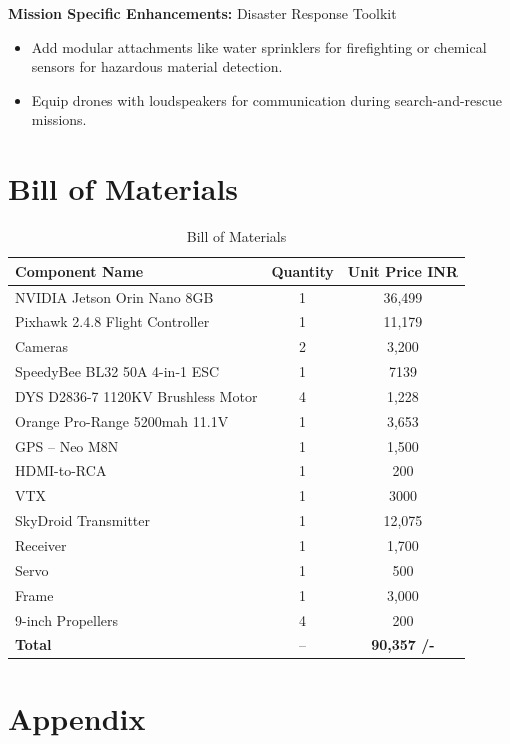 \documentclass[12pt]{report}
\begin{document}
    \noindent \textbf{Mission Specific Enhancements:} Disaster Response Toolkit 
    \begin{itemize}
      \item Add modular attachments like water sprinklers for firefighting or chemical sensors for hazardous material detection.
      \item Equip drones with loudspeakers for communication during search-and-rescue missions.
    \end{itemize}

  \chapter{Bill of Materials}
    \begin{table}[h!]
      \centering
      \caption{Bill of Materials} \vspace{0.2cm}
        \begin{tabular}{|l|c|c|}
          \hline
          \textbf{Component Name} & \textbf{Quantity} & \textbf{Unit Price {INR}} \\
          \hline
          NVIDIA Jetson Orin Nano 8GB & 1 & 36,499 \\
          Pixhawk 2.4.8 Flight Controller & 1 & 11,179 \\
          Cameras & 2 & 3,200 \\
          SpeedyBee BL32 50A 4-in-1 ESC &1 &7139\\
          DYS D2836-7 1120KV Brushless Motor &4 &1,228\\
          Orange Pro-Range 5200mah 11.1V & 1 &3,653\\
          GPS – Neo M8N  &1 &1,500\\
          HDMI-to-RCA & 1 & 200 \\
          VTX & 1 & 3000 \\
          SkyDroid Transmitter  &1 & 12,075\\
          Receiver & 1 & 1,700 \\
          Servo & 1 & 500\\
          Frame  &1& 3,000\\
          9-inch Propellers & 4 &200\\
          \hline
          \textbf{Total}  & --  & \textbf{90,357 /-}   \\      
          \hline
        \end{tabular}
    \end{table}

   \chapter{Appendix} 
\end{document}
